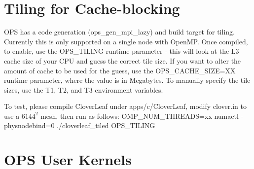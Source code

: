 \documentclass[11pt]{article}
\begin{document}
\newpage

\section{Tiling for Cache-blocking}
OPS has a code generation (ops\_gen\_mpi\_lazy) and build target for tiling. Currently this is only supported on a single
node with OpenMP. Once compiled, to enable, use the OPS\_TILING runtime parameter - this will look at the L3 cache size
of your CPU and guess the correct tile size. If you want to alter the amount of cache to be used for the guess, use the
OPS\_CACHE\_SIZE=XX runtime parameter, where the value is in Megabytes. To manually specify the tile sizes, use the 
T1, T2, and T3 environment variables.

To test, please compile CloverLeaf under apps/c/CloverLeaf, modify clover.in to use a $6144^2$ mesh, then run as follows:
OMP\_NUM\_THREADS=xx numactl -physnodebind=0 ./cloverleaf\_tiled OPS\_TILING

\newpage
\section{OPS User Kernels}
\end{document}
